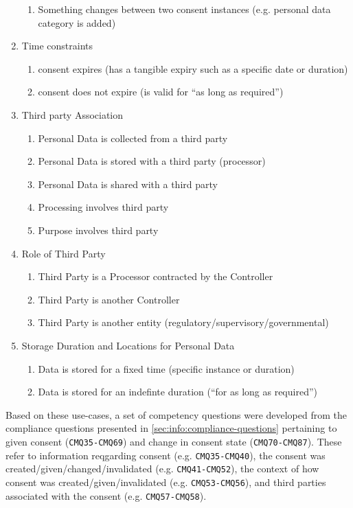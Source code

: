 \begin{enumerate}
  \begin{enumerate}
  \item
    Something changes between two consent instances (e.g. personal data
    category is added)
  \end{enumerate}
\item
  Time constraints

  \begin{enumerate}
  \item
    consent expires (has a tangible expiry such as a specific date or
    duration)
  \item
    consent does not expire (is valid for ``as long as required'')
  \end{enumerate}
\item
  Third party Association

  \begin{enumerate}
  \item
    Personal Data is collected from a third party
  \item
    Personal Data is stored with a third party (processor)
  \item
    Personal Data is shared with a third party
  \item
    Processing involves third party
  \item
    Purpose involves third party
  \end{enumerate}
\item
  Role of Third Party

  \begin{enumerate}
  \item
    Third Party is a Processor contracted by the Controller
  \item
    Third Party is another Controller
  \item
    Third Party is another entity (regulatory/supervisory/governmental)
  \end{enumerate}
\item
  Storage Duration and Locations for Personal Data

  \begin{enumerate}
  \item
    Data is stored for a fixed time (specific instance or duration)
  \item
    Data is stored for an indefinte duration (``for as long as
    required'')
  \end{enumerate}
\end{enumerate}
Based on these use-cases, a set of competency questions were developed from the compliance questions presented in \autoref{sec:info:compliance-questions} pertaining to given consent (\texttt{CMQ35-CMQ69}) and change in consent state (\texttt{CMQ70-CMQ87}).
These refer to information reqgarding consent (e.g. \texttt{CMQ35-CMQ40}), the consent was created/given/changed/invalidated (e.g. \texttt{CMQ41-CMQ52}), the context of how consent was created/given/invalidated (e.g. \texttt{CMQ53-CMQ56}), and third parties associated with the consent (e.g. \texttt{CMQ57-CMQ58}).


